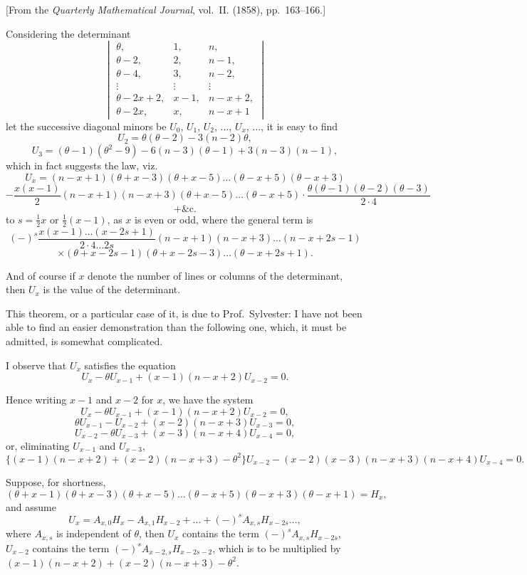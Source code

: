\documentclass[12pt,a4paper]{article}
\theoremstyle{plain}
\theoremstyle{definition}
\begin{document}
[From the \textit{Quarterly Mathematical Journal}, vol.~II. (1858), pp.~163--166.]

Considering the determinant
\[
\begin{vmatrix}
\theta, & 1, & n, \\
\theta - 2, & 2, & n - 1, \\
\theta - 4, & 3, & n - 2, \\
\vdots & \vdots & \vdots \\
\theta - 2x + 2, & x - 1, & n - x + 2, \\
\theta - 2x, & x, & n - x + 1
\end{vmatrix}
\]
let the successive diagonal minors be $U_0$, $U_1$, $U_2$, $\ldots$, $U_x$, $\ldots$, it is easy to find
\[
U_2 = \theta(\theta - 2) - 3(n - 2)\theta,
\]
\[
U_3 = (\theta - 1)(\theta^2 - 9) - 6(n - 3)(\theta - 1) + 3(n - 3)(n - 1),
\]
which in fact suggests the law, viz.
\[
U_x = (n - x + 1)(\theta + x - 3)(\theta + x - 5)\ldots(\theta - x + 5)(\theta - x + 3)
\]
\[
- \frac{x(x - 1)}{2}(n - x + 1)(n - x + 3)(\theta + x - 5)\ldots(\theta - x + 5) \cdot \frac{\theta(\theta - 1)(\theta - 2)(\theta - 3)}{2 \cdot 4}
\]
\[
+ \&\text{c.}
\]
to $s = \frac{1}{2}x$ or $\frac{1}{2}(x - 1)$, as $x$ is even or odd, where the general term is
\[
(-)^s \frac{x(x - 1)\ldots(x - 2s + 1)}{2 \cdot 4 \ldots 2s} (n - x + 1)(n - x + 3)\ldots(n - x + 2s - 1)
\]
\[
\times (\theta + x - 2s - 1)(\theta + x - 2s - 3)\ldots(\theta - x + 2s + 1).
\]

\newpage
[186]

And of course if $x$ denote the number of lines or columns of the determinant, then $U_x$ is the value of the determinant.

This theorem, or a particular case of it, is due to Prof.\ Sylvester: I have not been able to find an easier demonstration than the following one, which, it must be admitted, is somewhat complicated.

I observe that $U_x$ satisfies the equation
\[
U_x - \theta U_{x-1} + (x - 1)(n - x + 2)U_{x-2} = 0.
\]

Hence writing $x - 1$ and $x - 2$ for $x$, we have the system
\[
U_x - \theta U_{x-1} + (x - 1)(n - x + 2)U_{x-2} = 0,
\]
\[
\theta U_{x-1} - U_{x-2} + (x - 2)(n - x + 3)U_{x-3} = 0,
\]
\[
U_{x-2} - \theta U_{x-3} + (x - 3)(n - x + 4)U_{x-4} = 0,
\]
or, eliminating $U_{x-1}$ and $U_{x-3}$,
\[
\{(x - 1)(n - x + 2) + (x - 2)(n - x + 3) - \theta^2\}U_{x-2} - (x - 2)(x - 3)(n - x + 3)(n - x + 4)U_{x-4} = 0.
\]

Suppose, for shortness,
\[
(\theta + x - 1)(\theta + x - 3)(\theta + x - 5)\ldots(\theta - x + 5)(\theta - x + 3)(\theta - x + 1) = H_x,
\]
and assume
\[
U_x = A_{x,0}H_x - A_{x,1}H_{x-2} + \ldots + (-)^s A_{x,s}H_{x-2s} \ldots,
\]
where $A_{x,s}$ is independent of $\theta$, then $U_x$ contains the term $(-)^s A_{x,s}H_{x-2s}$, $U_{x-2}$ contains the term $(-)^s A_{x-2,s}H_{x-2s-2}$, which is to be multiplied by $(x - 1)(n - x + 2) + (x - 2)(n - x + 3) - \theta^2$.
\end{document}
